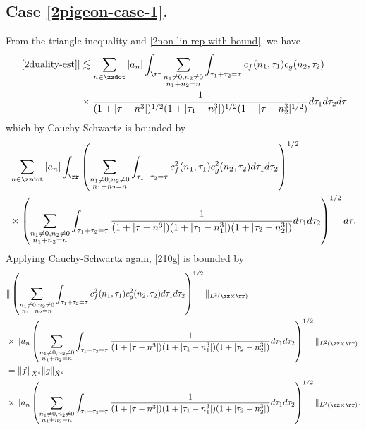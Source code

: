 \subsection{Case \eqref{2pigeon-case-1}.} From the triangle inequality and \eqref{2non-lin-rep-with-bound}, we have
%
%
\begin{equation*}
	\begin{split}
	 |\eqref{2duality-est}|
	& \lesssim \sum_{n \in \zzdot} |a_{n}| \int_{\rr} \sum_{\substack{n_1 \neq 0, n_2 \neq 0
		\\ n_1 +n_2 =n}} \int_{\tau_1 + \tau_2 = \tau} c_f(n_1, \tau_1)
		c_g(n_2, \tau_2)
		\\
		& \times \frac{1}{(1 + | \tau - n^{3} |)^{1/2}(1 + |
		\tau_{1}-n_{1}^{3} |)^{1/2}(1 + | \tau-n_{2}^{3} |^{1/2})} d \tau_1 d \tau_2
		d \tau
	\end{split}
\end{equation*}
%
%
which by Cauchy-Schwartz is bounded by
%
%
\begin{equation}
	\label{210g}
	\begin{split}
		& \sum_{n \in \zzdot} |a_n| \int_{\rr} \left(  \sum_{\substack{n_1 \neq 0, n_2
		\neq 0 \\n_1 +n_2 =n}} \int_{\tau_1 + \tau_2 = \tau} c_{f}^{2}(n_1, \tau_1)
		c_{g}^{2} (n_2, \tau_2) d \tau_1 d \tau_2 \right)^{1/2} 
		\\
		& \times \left( \sum_{\substack{n_1 \neq 0, n_2 \neq 0 \\n_1 +n_2 =n}}
		\int_{\tau_1 + \tau_2 = \tau} \frac{1}{(1 + | \tau - n^{3} |)(1 + | \tau_{1}-n_{1}^{3} |)(1 + |
		\tau_2 -n_{2}^{3} |)} d \tau_1 d \tau_2
		\right)^{1/2} d \tau.
	\end{split}
\end{equation}
%
%
Applying Cauchy-Schwartz again, \eqref{210g} is bounded by
%
%
\begin{align}
	\notag
		& \|\left( \sum_{\substack{n_1 \neq 0, n_2 \neq 0 \\n_1 +n_2 =n}}\int_{\tau_1 + \tau_2 = \tau} c_{f}^{2}(n_1, \tau_1)
		c_{g}^{2} (n_2, \tau_2) d \tau_1 d \tau_2 \right)^{1/2} \|_{L^{2}(\zz \times
		\rr)}
		\\
		\notag
		& \times  \|a_{n}
		\left( \sum_{\substack{n_1 \neq 0, n_2 \neq 0 \\n_1 +n_2
		=n}}\int_{\tau_1 + \tau_2 = \tau} \frac{1}{(1 + | \tau - n^{3} |)(1 + |
		\tau_{1}-n_{1}^{3} |)(1 + | \tau_2 -n_{2}^{3} |)} d \tau_1 d \tau_2
		\right)^{1/2} \|_{L^2(\zz \times \rr)}
		\\
		\notag
		& = \|f\|_{\dot{X}^s} \|g\|_{\dot{X}^s}
		\\
		\label{2holder-term}
		& \times 
		\|a_{n}
		\left( \sum_{\substack{n_1 \neq 0, n_2 \neq 0 \\n_1 +n_2
		=n}}\int_{\tau_1 + \tau_2 = \tau} \frac{1}{(1 + | \tau - n^{3} |)(1 + |
		\tau_{1}-n_{1}^{3} |)(1 + | \tau_2 -n_{2}^{3} |)} d \tau_1 d \tau_2
		\right)^{1/2} \|_{L^2(\zz \times \rr)}.
\end{align}
